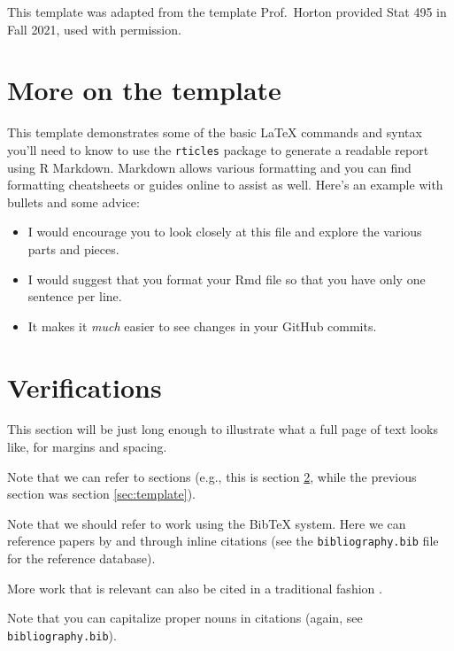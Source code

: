 \documentclass[12pt]{article}
\providecommand{\tightlist}{%
  \setlength{\itemsep}{0pt}\setlength{\parskip}{0pt}}
\begin{document}
This template was adapted from the template Prof.~Horton provided Stat
495 in Fall 2021, used with permission.

\hypertarget{more-on-the-template}{%
\section{More on the template}\label{more-on-the-template}}

\label{sec:template}

This template demonstrates some of the basic LaTeX commands and syntax
you'll need to know to use the \texttt{rticles} package to generate a
readable report using R Markdown. Markdown allows various formatting and
you can find formatting cheatsheets or guides online to assist as well.
Here's an example with bullets and some advice:

\begin{itemize}
\tightlist
\item
  I would encourage you to look closely at this file and explore the
  various parts and pieces.
\item
  I would suggest that you format your Rmd file so that you have only
  one sentence per line.
\item
  It makes it \emph{much} easier to see changes in your GitHub commits.
\end{itemize}

\section{Verifications}
\label{sec:verify}

This section will be just long enough to illustrate what a full page of
text looks like, for margins and spacing.

Note that we can refer to sections (e.g., this is section
\ref{sec:verify}, while the previous section was section
\ref{sec:template}).

Note that we should refer to work using the BibTeX system. Here we can
reference papers by \citet{Campbell02} and \citet{Schubert13} through
inline citations (see the \texttt{bibliography.bib} file for the
reference database).

More work that is relevant can also be cited in a traditional fashion
\citep[\citet{Galyardt14mmm},\citet{Galyardt12dis}]{Chi81}.

Note that you can capitalize proper nouns in citations
\citep{Campbell02} (again, see \texttt{bibliography.bib}).
\end{document}
